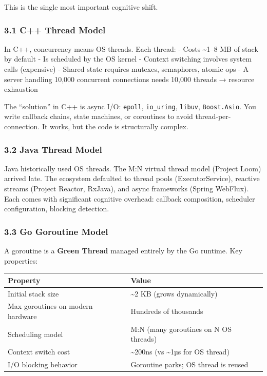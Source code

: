 \documentclass[
]{article}
\begin{document}
This is the single most important cognitive shift.

\hypertarget{c-thread-model}{%
\subsubsection{3.1 C++ Thread Model}\label{c-thread-model}}

In C++, concurrency means OS threads. Each thread: - Costs
\textasciitilde1--8 MB of stack by default - Is scheduled by the OS
kernel - Context switching involves system calls (expensive) - Shared
state requires mutexes, semaphores, atomic ops - A server handling
10,000 concurrent connections needs 10,000 threads → resource exhaustion

The ``solution'' in C++ is async I/O: \texttt{epoll},
\texttt{io\_uring}, \texttt{libuv}, \texttt{Boost.Asio}. You write
callback chains, state machines, or coroutines to avoid
thread-per-connection. It works, but the code is structurally complex.

\hypertarget{java-thread-model}{%
\subsubsection{3.2 Java Thread Model}\label{java-thread-model}}

Java historically used OS threads. The M:N virtual thread model (Project
Loom) arrived late. The ecosystem defaulted to thread pools
(ExecutorService), reactive streams (Project Reactor, RxJava), and async
frameworks (Spring WebFlux). Each comes with significant cognitive
overhead: callback composition, scheduler configuration, blocking
detection.

\hypertarget{go-goroutine-model}{%
\subsubsection{3.3 Go Goroutine Model}\label{go-goroutine-model}}

A goroutine is a \textbf{Green Thread} managed entirely by the Go
runtime. Key properties:

\begin{longtable}[]{@{}ll@{}}
\toprule()
Property & Value \\
\midrule()
\endhead
Initial stack size & \textasciitilde2 KB (grows dynamically) \\
Max goroutines on modern hardware & Hundreds of thousands \\
Scheduling model & M:N (many goroutines on N OS threads) \\
Context switch cost & \textasciitilde200ns (vs \textasciitilde1µs for OS
thread) \\
I/O blocking behavior & Goroutine parks; OS thread is reused \\
\bottomrule()
\end{longtable}
\end{document}
